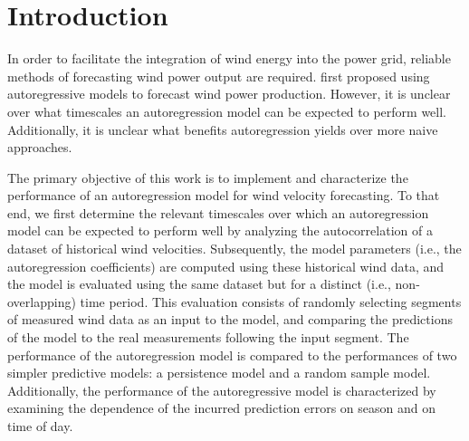 \documentclass[11pt, oneside]{article}
\begin{document}

\newpage
\pagestyle{pages}
\section{Introduction}
In order to facilitate the integration of wind energy into the power grid, reliable methods of forecasting wind power output are required.
\citet{Brown1984} first proposed using autoregressive models to forecast wind power production.
However, it is unclear over what timescales an autoregression model can be expected to perform well.
Additionally, it is unclear what benefits autoregression yields over more naive approaches.

The primary objective of this work is to implement and characterize the performance of an autoregression model for wind velocity forecasting.
To that end, we first determine the relevant timescales over which an autoregression model can be expected to perform well by analyzing the autocorrelation of a dataset of historical wind velocities.
Subsequently, the model parameters (i.e., the autoregression coefficients) are computed using these historical wind data, and the model is evaluated using the same dataset but for a distinct (i.e., non-overlapping) time period.
This evaluation consists of randomly selecting segments of measured wind data as an input to the model, and comparing the predictions of the model to the real measurements following the input segment.
The performance of the autoregression model is compared to the performances of two simpler predictive models: a persistence model and a random sample model.
Additionally, the performance of the autoregressive model is characterized by examining the dependence of the incurred prediction errors on season and on time of day.
\end{document}
